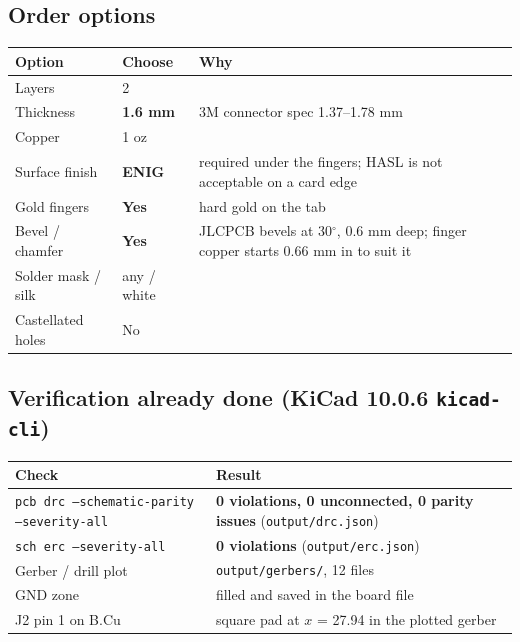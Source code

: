 \documentclass[11pt,a4paper]{article}
\begin{document}
\subsection{Order options}
\begin{center}
\begin{tabular}{@{}p{45mm}p{30mm}p{85mm}@{}}
\toprule
Option & Choose & Why\\
\midrule
Layers & 2 & \\
Thickness & \textbf{1.6 mm} & 3M connector spec 1.37--1.78 mm\\
Copper & 1 oz & \\
Surface finish & \textbf{ENIG} & required under the fingers; HASL is not acceptable on a card edge\\
Gold fingers & \textbf{Yes} & hard gold on the tab\\
Bevel / chamfer & \textbf{Yes} & JLCPCB bevels at 30$^\circ$, 0.6 mm deep; finger copper starts 0.66 mm in to suit it\\
Solder mask / silk & any / white & \\
Castellated holes & No & \\
\bottomrule
\end{tabular}
\end{center}

\subsection{Verification already done (KiCad 10.0.6 \texttt{kicad-cli})}
\begin{center}
\begin{tabular}{@{}p{75mm}p{85mm}@{}}
\toprule
Check & Result\\
\midrule
\texttt{pcb drc --schematic-parity --severity-all} & \textbf{0 violations, 0 unconnected, 0 parity issues} (\texttt{output/drc.json})\\
\texttt{sch erc --severity-all} & \textbf{0 violations} (\texttt{output/erc.json})\\
Gerber / drill plot & \texttt{output/gerbers/}, 12 files\\
GND zone & filled and saved in the board file\\
J2 pin 1 on B.Cu & square pad at $x$ = 27.94 in the plotted gerber\\
\bottomrule
\end{tabular}
\end{center}
\end{document}
